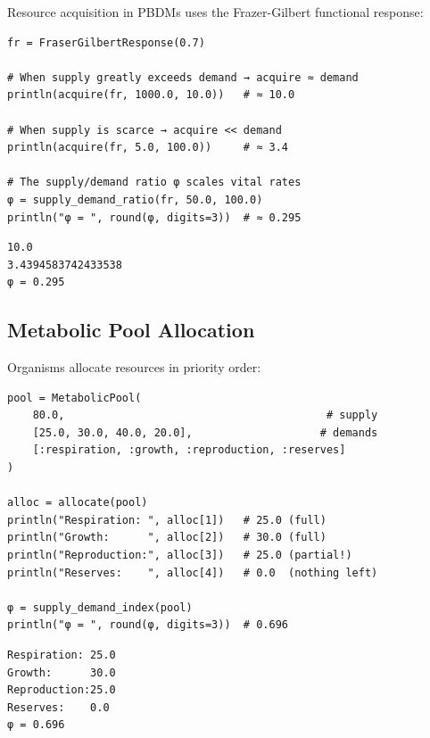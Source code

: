 Resource acquisition in PBDMs uses the Frazer-Gilbert functional response:




\begin{verbatim}
fr = FraserGilbertResponse(0.7)

# When supply greatly exceeds demand → acquire ≈ demand
println(acquire(fr, 1000.0, 10.0))   # ≈ 10.0

# When supply is scarce → acquire << demand
println(acquire(fr, 5.0, 100.0))     # ≈ 3.4

# The supply/demand ratio φ scales vital rates
φ = supply_demand_ratio(fr, 50.0, 100.0)
println("φ = ", round(φ, digits=3))  # ≈ 0.295
\end{verbatim}




\begin{verbatim}
10.0
3.4394583742433538
φ = 0.295
\end{verbatim}



\subsection{Metabolic Pool Allocation}



\label{1781271705069524406}{}


Organisms allocate resources in priority order:




\begin{verbatim}
pool = MetabolicPool(
    80.0,                                         # supply
    [25.0, 30.0, 40.0, 20.0],                    # demands
    [:respiration, :growth, :reproduction, :reserves]
)

alloc = allocate(pool)
println("Respiration: ", alloc[1])   # 25.0 (full)
println("Growth:      ", alloc[2])   # 30.0 (full)
println("Reproduction:", alloc[3])   # 25.0 (partial!)
println("Reserves:    ", alloc[4])   # 0.0  (nothing left)

φ = supply_demand_index(pool)
println("φ = ", round(φ, digits=3))  # 0.696
\end{verbatim}




\begin{verbatim}
Respiration: 25.0
Growth:      30.0
Reproduction:25.0
Reserves:    0.0
φ = 0.696
\end{verbatim}




